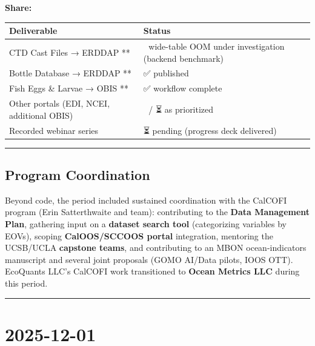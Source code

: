 \documentclass[
  letterpaper,
  DIV=11,
  numbers=noendperiod]{scrreprt}
\begin{document}
\textbf{Share:}

\begin{longtable}[]{@{}
  >{\raggedright\arraybackslash}p{}
  >{\raggedright\arraybackslash}p{}@{}}
\toprule\noalign{}
\begin{minipage}[b]{\linewidth}\raggedright
Deliverable
\end{minipage} & \begin{minipage}[b]{\linewidth}\raggedright
Status
\end{minipage} \\
\midrule\noalign{}
\endhead
\bottomrule\noalign{}
\endlastfoot
CTD Cast Files → ERDDAP ** & 🔄 wide-table OOM under investigation
(backend benchmark) \\
Bottle Database → ERDDAP ** & ✅ published \\
Fish Eggs \& Larvae → OBIS ** & ✅ workflow complete \\
Other portals (EDI, NCEI, additional OBIS) & 🔄 / ⏳ as prioritized \\
Recorded webinar series & ⏳ pending (progress deck delivered) \\
\end{longtable}

\begin{center}\rule{0.5\linewidth}{0.5pt}\end{center}

\subsection{Program Coordination}\label{program-coordination}

Beyond code, the period included sustained coordination with the CalCOFI
program (Erin Satterthwaite and team): contributing to the \textbf{Data
Management Plan}, gathering input on a \textbf{dataset search tool}
(categorizing variables by EOVs), scoping \textbf{CalOOS/SCCOOS portal}
integration, mentoring the UCSB/UCLA \textbf{capstone teams}, and
contributing to an MBON ocean-indicators manuscript and several joint
proposals (GOMO AI/Data pilots, IOOS OTT). EcoQuants LLC's CalCOFI work
transitioned to \textbf{Ocean Metrics LLC} during this period.

\begin{center}\rule{0.5\linewidth}{0.5pt}\end{center}

\section{2025-12-01}\label{section-1}
\end{document}
